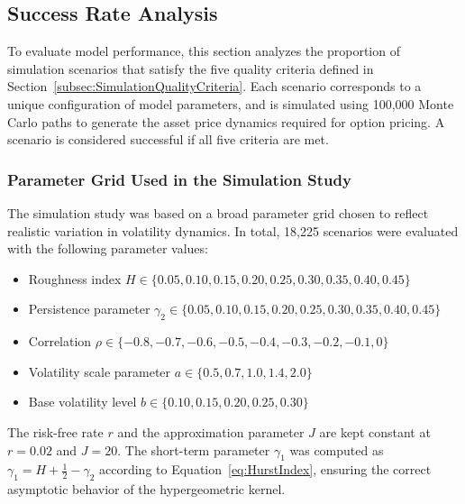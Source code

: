 \newpage
\subsection{Success Rate Analysis} \label{subsec:SuccessRateAnalysis}

To evaluate model performance, this section analyzes the proportion of simulation scenarios that satisfy the five quality criteria defined in Section~\ref{subsec:SimulationQualityCriteria}. Each scenario corresponds to a unique configuration of model parameters, and is simulated using 100{,}000 Monte Carlo paths to generate the asset price dynamics required for option pricing. A scenario is considered successful if all five criteria are met.

\subsubsection*{Parameter Grid Used in the Simulation Study}
The simulation study was based on a broad parameter grid chosen to reflect realistic variation in volatility dynamics. In total, 18{,}225 scenarios were evaluated with the following parameter values:
\begin{itemize}
    \item Roughness index $H \in \{0.05, 0.10, 0.15, 0.20, 0.25, 0.30, 0.35, 0.40, 0.45\}$
    \item Persistence parameter $\gamma_2 \in \{0.05, 0.10, 0.15, 0.20, 0.25, 0.30, 0.35, 0.40, 0.45\}$
    \item Correlation $\rho \in \{-0.8, -0.7, -0.6, -0.5, -0.4, -0.3, -0.2, -0.1, 0\}$
    \item Volatility scale parameter $a \in \{0.5, 0.7, 1.0, 1.4, 2.0\}$
    \item Base volatility level $b \in \{0.10, 0.15, 0.20, 0.25, 0.30\}$
\end{itemize}
The risk-free rate $r$ and the approximation parameter $J$ are kept constant at $r = 0.02$ and $J = 20$. The short-term parameter $\gamma_1$ was computed as $\gamma_1 = H + \tfrac{1}{2} - \gamma_2$ according to Equation~\eqref{eq:HurstIndex}, ensuring the correct asymptotic behavior of the hypergeometric kernel.

